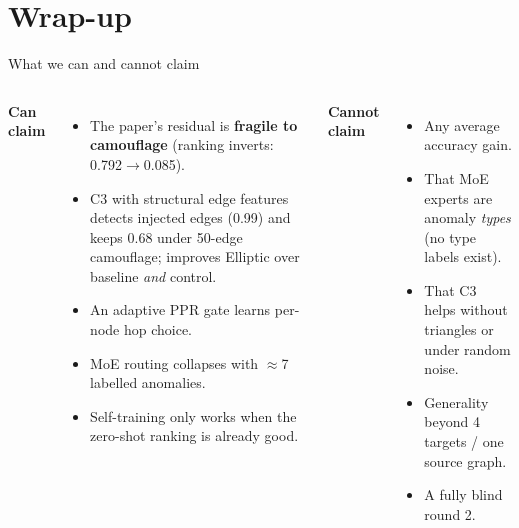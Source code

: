 \documentclass[aspectratio=169,11pt]{beamer}
\begin{document}
\section{Wrap-up}
\begin{frame}{What we can and cannot claim}
\begin{columns}[T]
\textcolor{good}{\textbf{Can claim}}
\begin{itemize}\footnotesize
\item The paper's residual is \textbf{fragile to camouflage} (ranking inverts: 0.792$\to$0.085).
\item C3 with structural edge features detects injected edges (0.99) and keeps 0.68 under 50-edge camouflage; improves Elliptic over baseline \emph{and} control.
\item An adaptive PPR gate learns per-node hop choice.
\item MoE routing collapses with $\approx$7 labelled anomalies.
\item Self-training only works when the zero-shot ranking is already good.
\end{itemize}
\textcolor{bad}{\textbf{Cannot claim}}
\begin{itemize}\footnotesize
\item Any average accuracy gain.
\item That MoE experts are anomaly \emph{types} (no type labels exist).
\item That C3 helps without triangles or under random noise.
\item Generality beyond 4 targets / one source graph.
\item A fully blind round 2.
\end{itemize}
\end{columns}
\end{frame}
\end{document}
